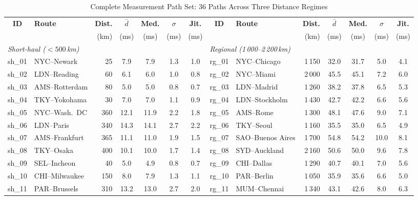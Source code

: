 \documentclass[conference]{IEEEtran}
\begin{document}
\begin{table}[t]
\caption{Complete Measurement Path Set: 36 Paths Across Three Distance Regimes}
\label{tab:paths}
\begin{center}
\setlength{\tabcolsep}{3.5pt}
\begin{tabular}{clrcccc|clrcccc}
\toprule
\textbf{ID} & \textbf{Route} & \textbf{Dist.} & $\bar{d}$ & \textbf{Med.} & $\sigma$ & \textbf{Jit.} &
\textbf{ID} & \textbf{Route} & \textbf{Dist.} & $\bar{d}$ & \textbf{Med.} & $\sigma$ & \textbf{Jit.} \\
 & & (km) & (ms) & (ms) & (ms) & (ms) &
 & & (km) & (ms) & (ms) & (ms) & (ms) \\
\midrule
\multicolumn{7}{l}{\textit{Short-haul ($< 500$\,km)}} & \multicolumn{7}{l}{\textit{Regional (1\,000--2\,200\,km)}} \\
\cmidrule(lr){1-7} \cmidrule(lr){8-14}
sh\_01 & NYC--Newark & 25 & 7.9 & 7.9 & 1.3 & 1.0 &
rg\_01 & NYC--Chicago & 1\,150 & 32.0 & 31.7 & 5.0 & 4.1 \\
sh\_02 & LDN--Reading & 60 & 6.1 & 6.0 & 1.0 & 0.8 &
rg\_02 & NYC--Miami & 2\,000 & 45.5 & 45.1 & 7.2 & 6.0 \\
sh\_03 & AMS--Rotterdam & 80 & 5.0 & 5.0 & 0.8 & 0.7 &
rg\_03 & LDN--Madrid & 1\,260 & 38.2 & 37.8 & 6.5 & 5.3 \\
sh\_04 & TKY--Yokohama & 30 & 7.0 & 7.0 & 1.1 & 0.9 &
rg\_04 & LDN--Stockholm & 1\,430 & 42.7 & 42.2 & 6.6 & 5.6 \\
sh\_05 & NYC--Wash.\ DC & 360 & 12.1 & 11.9 & 2.2 & 1.8 &
rg\_05 & AMS--Rome & 1\,300 & 48.1 & 47.6 & 9.0 & 7.1 \\
sh\_06 & LDN--Paris & 340 & 14.3 & 14.1 & 2.7 & 2.2 &
rg\_06 & TKY--Seoul & 1\,160 & 35.5 & 35.0 & 6.5 & 4.9 \\
sh\_07 & AMS--Frankfurt & 365 & 11.1 & 11.0 & 1.9 & 1.5 &
rg\_07 & SAO--Buenos Aires & 1\,700 & 54.8 & 54.2 & 10.0 & 8.1 \\
sh\_08 & TKY--Osaka & 400 & 10.1 & 10.0 & 1.7 & 1.4 &
rg\_08 & SYD--Auckland & 2\,160 & 50.6 & 50.0 & 9.6 & 7.8 \\
sh\_09 & SEL--Incheon & 40 & 5.0 & 4.9 & 0.8 & 0.7 &
rg\_09 & CHI--Dallas & 1\,290 & 40.7 & 40.1 & 7.0 & 5.6 \\
sh\_10 & CHI--Milwaukee & 150 & 8.0 & 7.9 & 1.3 & 1.1 &
rg\_10 & PAR--Berlin & 1\,050 & 35.9 & 35.6 & 6.6 & 5.0 \\
sh\_11 & PAR--Brussels & 310 & 13.2 & 13.0 & 2.7 & 2.0 &
rg\_11 & MUM--Chennai & 1\,340 & 43.1 & 42.6 & 8.0 & 6.3 \\

\end{tabular}
\end{center}
\end{table}
\end{document}
